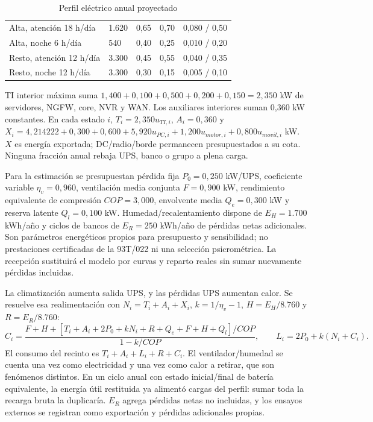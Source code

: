 \begin{table}[htbp]
\centering\small
\caption{Perfil eléctrico anual proyectado}\label{tab:4-perfil-anual}
\begin{tabularx}{\linewidth}{X R{19mm} R{18mm} R{18mm} R{30mm}}
\hline
{} &  &  &  &  \\ \hline
Alta, atención 18 h/día & 1.620 & 0,65 & 0,70 & 0,080 / 0,50 \\ \hline
Alta, noche 6 h/día & 540 & 0,40 & 0,25 & 0,010 / 0,20 \\ \hline
Resto, atención 12 h/día & 3.300 & 0,45 & 0,55 & 0,040 / 0,35 \\ \hline
Resto, noche 12 h/día & 3.300 & 0,30 & 0,15 & 0,005 / 0,10 \\ \hline
\end{tabularx}
\end{table}

TI interior máxima suma $1,400+0,100+0,500+0,200+0,150=2,350$ kW de servidores, NGFW, core, NVR y WAN. Los auxiliares interiores suman 0,360 kW constantes. En cada estado $i$, $T_i=2,350u_{TI,i}$, $A_i=0,360$ y $X_i=4,214222+0,300+0,600+5,920u_{PC,i}+1,200u_{motor,i}+0,800u_{movil,i}$ kW. $X$ es energía exportada; DC/radio/borde permanecen presupuestados a su cota. Ninguna fracción anual rebaja UPS, banco o grupo a plena carga.

Para la estimación se presupuestan pérdida fija $P_0=0,250$ kW/UPS, coeficiente variable $\eta_v=0,960$, ventilación media conjunta $F=0,900$ kW, rendimiento equivalente de compresión $COP=3,000$, envolvente media $Q_e=0,300$ kW y reserva latente $Q_l=0,100$ kW. Humedad/recalentamiento dispone de $E_H=1.700$ kWh/año y ciclos de bancos de $E_R=250$ kWh/año de pérdidas netas adicionales. Son parámetros energéticos propios para presupuesto y sensibilidad; no prestaciones certificadas de la 93T/022 ni una selección psicrométrica. La recepción sustituirá el modelo por curvas y reparto reales sin sumar nuevamente pérdidas incluidas.

La climatización aumenta salida UPS, y las pérdidas UPS aumentan calor. Se resuelve esa realimentación con $N_i=T_i+A_i+X_i$, $k=1/\eta_v-1$, $H=E_H/8.760$ y $R=E_R/8.760$:
\[
C_i=\frac{F+H+[T_i+A_i+2P_0+kN_i+R+Q_e+F+H+Q_l]/COP}{1-k/COP},
\qquad L_i=2P_0+k(N_i+C_i).
\]
El consumo del recinto es $T_i+A_i+L_i+R+C_i$. El ventilador/humedad se cuenta una vez como electricidad y una vez como calor a retirar, que son fenómenos distintos. En un ciclo anual con estado inicial/final de batería equivalente, la energía útil restituida ya alimentó cargas del perfil: sumar toda la recarga bruta la duplicaría. $E_R$ agrega pérdidas netas no incluidas, y los ensayos externos se registran como exportación y pérdidas adicionales propias.

